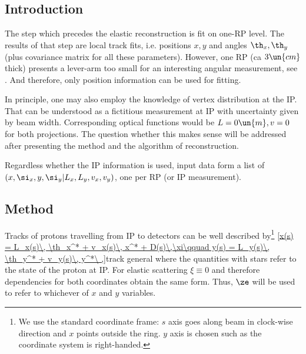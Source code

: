 \subsection[intro]{Introduction}

The step which precedes the elastic reconstruction is fit on one-RP level. The results of that step are local track fits, i.e. positions $x, y$ and angles $\th_x, \th_y$ (plus covariance matrix for all these parameters). However, one RP (ca $3\un{cm}$ thick) presents a lever-arm too small for an interesting angular measurement, see . And therefore, only position information can be used for fitting.

In principle, one may also employ the knowledge of vertex distribution at the IP. That can be understood as a fictitious measurement at IP with uncertainty given by beam width. Corresponding optical functions would be $L = 0\un{m}, v = 0$ for both projections. The question whether this makes sense will be addressed after presenting the method and the algorithm of reconstruction.

Regardless whether the IP information is used, input data form a list of $(x, \si_x, y, \si_y|\penalty0 L_x, L_y, v_x, v_y)$, one per RP (or IP measurement).




\subsection[method]{Method}
Tracks of protons travelling from IP to detectors can be well described by\footnote{We use the standard coordinate frame: $s$ axis goes along beam in clock-wise direction and $x$ points outside the ring. $y$ axis is chosen such as the coordinate system is right-handed.}
\eqref{x(s) = L_x(s)\, \th_x^* + v_x(s)\, x^* + D(s)\,\xi\qquad y(s) = L_y(s)\, \th_y^* + v_y(s)\, y^*\ ,}{track general}
where the quantities with stars refer to the state of the proton at IP. For elastic scattering $\xi\equiv 0$ and therefore dependencies for both coordinates obtain the same form. Thus, $\ze$ will be used to refer to whichever of $x$ and $y$ variables.

